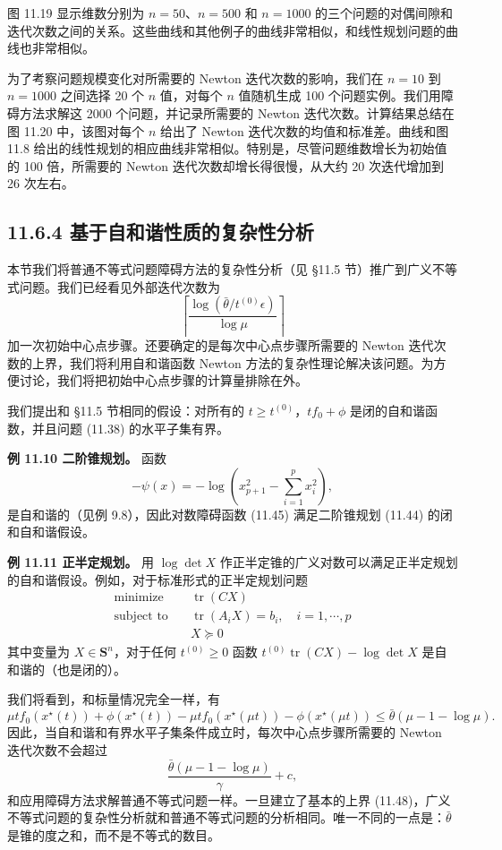 \documentclass[UTF8, 12pt, fontset=fandol, oneside]{ctexart}
\begin{document}
图 11.19 显示维数分别为 $n=50$、$n=500$ 和 $n=1000$ 的三个问题的对偶间隙和迭代次数之间的关系。这些曲线和其他例子的曲线非常相似，和线性规划问题的曲线也非常相似。

为了考察问题规模变化对所需要的 Newton 迭代次数的影响，我们在 $n=10$ 到 $n=1000$ 之间选择 20 个 $n$ 值，对每个 $n$ 值随机生成 100 个问题实例。我们用障碍方法求解这 2000 个问题，并记录所需要的 Newton 迭代次数。计算结果总结在图 11.20 中，该图对每个 $n$ 给出了 Newton 迭代次数的均值和标准差。曲线和图 11.8 给出的线性规划的相应曲线非常相似。特别是，尽管问题维数增长为初始值的 100 倍，所需要的 Newton 迭代次数却增长得很慢，从大约 20 次迭代增加到 26 次左右。

\subsection*{11.6.4 基于自和谐性质的复杂性分析}

本节我们将普通不等式问题障碍方法的复杂性分析（见 \S 11.5 节）推广到广义不等式问题。我们已经看见外部迭代次数为
\[
\left\lceil\frac{\log(\bar{\theta}/t^{(0)}\epsilon)}{\log\mu}\right\rceil
\]
加一次初始中心点步骤。还要确定的是每次中心点步骤所需要的 Newton 迭代次数的上界，我们将利用自和谐函数 Newton 方法的复杂性理论解决该问题。为方便讨论，我们将把初始中心点步骤的计算量排除在外。

我们提出和 \S 11.5 节相同的假设：对所有的 $t\geq t^{(0)}$，$tf_0+\phi$ 是闭的自和谐函数，并且问题 (11.38) 的水平子集有界。

\noindent\textbf{例 11.10 二阶锥规划。} 函数
\[
-\psi(x)=-\log\left(x_{p+1}^2-\sum_{i=1}^p x_i^2\right),
\]
是自和谐的（见例 9.8），因此对数障碍函数 (11.45) 满足二阶锥规划 (11.44) 的闭和自和谐假设。

\noindent\textbf{例 11.11 正半定规划。} 用 $\log\det X$ 作正半定锥的广义对数可以满足正半定规划的自和谐假设。例如，对于标准形式的正半定规划问题
\[
\begin{aligned}
\text{minimize}\quad & \operatorname{tr}(CX)\\
\text{subject to}\quad & \operatorname{tr}(A_iX)=b_i,\quad i=1,\cdots,p\\
& X\succeq 0
\end{aligned}
\]
其中变量为 $X\in\mathbf{S}^n$，对于任何 $t^{(0)}\geq 0$ 函数 $t^{(0)}\operatorname{tr}(CX)-\log\det X$ 是自和谐的（也是闭的）。

我们将看到，和标量情况完全一样，有
\begin{equation}
\mu tf_0(x^\star(t))+\phi(x^\star(t))-\mu tf_0(x^\star(\mu t))-\phi(x^\star(\mu t))\leq \bar{\theta}(\mu-1-\log\mu).
\tag{11.48}
\end{equation}
因此，当自和谐和有界水平子集条件成立时，每次中心点步骤所需要的 Newton 迭代次数不会超过
\[
\frac{\bar{\theta}(\mu-1-\log\mu)}{\gamma}+c,
\]
和应用障碍方法求解普通不等式问题一样。一旦建立了基本的上界 (11.48)，广义不等式问题的复杂性分析就和普通不等式问题的分析相同。唯一不同的一点是：$\bar{\theta}$ 是锥的度之和，而不是不等式的数目。
\end{document}
